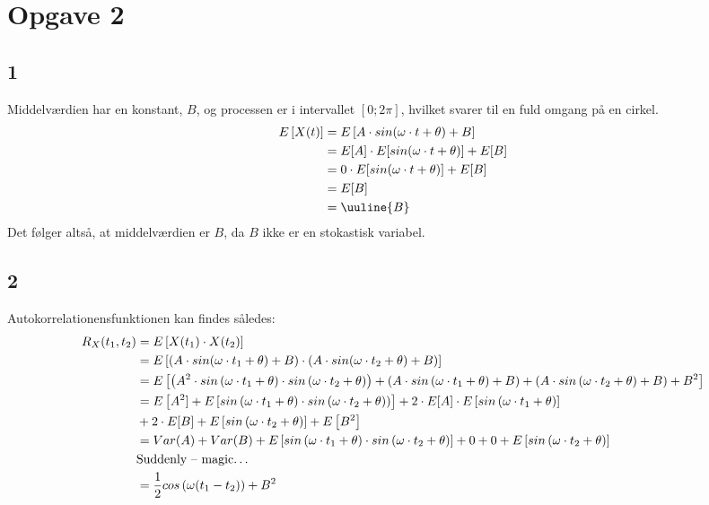 \documentclass{article}
\begin{document}
\section*{Opgave 2} %

\subsection*{1} %
Middelværdien har en konstant, $B$, og processen er i intervallet $[0 ; 2\pi]$, hvilket svarer til en fuld omgang på en cirkel.
\begin{align}
E\left[X(t)\right] &= E\left[ A \cdot sin( \omega \cdot t + \theta) + B \right] \\
	&= E[A] \cdot E[sin(\omega \cdot t + \theta)] + E[B] \\
	&= 0 \cdot E[sin(\omega \cdot t + \theta)] + E[B] \\
	&= E[B] \\
	&= \uuline{B}
\end{align}
Det følger altså, at middelværdien er $B$, da $B$ ikke er en stokastisk variabel.

\subsection*{2} %
Autokorrelationensfunktionen kan findes således:
\begin{align}
R_X(t_1, t_2) &= E\left[ X(t_1) \cdot X(t_2) \right] \\
	&= E\left[ \left(A \cdot sin( \omega \cdot t_1 + \theta) + B \right) \cdot \left(A \cdot sin( \omega \cdot t_2 + \theta) + B \right) \right] \\
	&= E\left[ \left(A^2 \cdot sin \left(\omega \cdot t_1 + \theta \right)  \cdot sin \left(\omega \cdot t_2 + \theta \right)\right) + \left(A \cdot sin \left(\omega \cdot t_1 + \theta \right) + B\right)  + \left(A \cdot sin \left(\omega \cdot t_2 + \theta \right) + B\right) + B^2 \right] \\
	&= E\left[A^2] + E\left[sin \left(\omega \cdot t_1 + \theta \right)  \cdot sin \left(\omega \cdot t_2 + \theta \right)\right)\right]
	+ 2 \cdot E[A] \cdot E\left[sin \left(\omega \cdot t_1 + \theta \right) \right] \\ &+ 2 \cdot E[B] + E\left[sin \left(\omega \cdot t_2 + \theta \right) \right]
	+ E\left[B^2 \right] \nonumber \\
	&= Var(A) + Var(B) + E\left[sin \left(\omega \cdot t_1 + \theta \right)  \cdot sin \left(\omega \cdot t_2 + \theta \right)\right] + 0 + 0 + E\left[sin \left(\omega \cdot t_2 + \theta \right) \right] \\
	&\text{Suddenly -- magic\dots} \nonumber \\
	&= \dfrac{1}{2}cos \left(\omega(t_1- t_2)\right) + B^2
\end{align}
\end{document}
